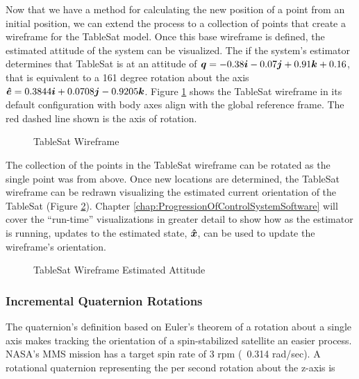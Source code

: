 Now that we have a method for calculating the new position of a point from an initial position, we can extend the process to a collection of points that create a wireframe for the TableSat model.  Once this base wireframe is defined, the estimated attitude of the system can be visualized.  The if the system's estimator determines that TableSat is at an attitude of $\boldsymbol{q} = -0.38\boldsymbol{i}-0.07\boldsymbol{j}+0.91\boldsymbol{k}+0.16$, that is equivalent to a 161 degree rotation about the axis $\boldsymbol{\hat{e}} = 0.3844\boldsymbol{i}+0.0708\boldsymbol{j}-0.9205\boldsymbol{k}$.  Figure \ref{fig:TSatWireframe} shows the TableSat wireframe in its default configuration with body axes align with the global reference frame.  The red dashed line shown is the axis of rotation.


\begin{figure}[H]
  \centerline{}
  \caption{TableSat Wireframe}
  \label{fig:TSatWireframe}
\end{figure}

The collection of the points in the TableSat wireframe can be rotated as the single point was from above.  Once new locations are determined, the TableSat wireframe can be redrawn visualizing the estimated current orientation of the TableSat (Figure \ref{fig:TSatWireframeEstimatedAttitude}).  Chapter \ref{chap:ProgressionOfControlSystemSoftware} will cover the ``run-time'' visualizations in greater detail to show how as the estimator is running, updates to the estimated state, $\boldsymbol{\hat{x}}$, can be used to update the wireframe's orientation.

\begin{figure}[H]
  \centerline{}
  \caption{TableSat Wireframe Estimated Attitude}
  \label{fig:TSatWireframeEstimatedAttitude}
\end{figure}


\subsubsection{Incremental Quaternion Rotations}
\label{subsubsec:IncrementalQuaternionRotations}

The quaternion's definition based on Euler's theorem of a rotation about a single axis makes tracking the orientation of a spin-stabilized satellite an easier process.  NASA's MMS mission has a target spin rate of 3 rpm (~0.314 rad/sec).  A rotational quaternion representing the per second rotation about the z-axis is

